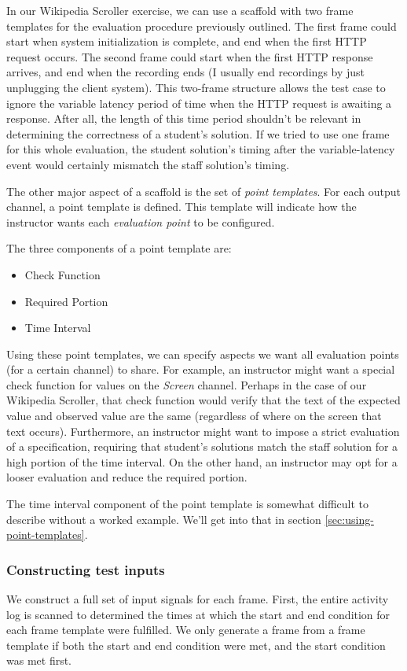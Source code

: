 \documentclass[12pt]{article}
\begin{document}
In our Wikipedia Scroller exercise, we can use a scaffold with two frame templates for the evaluation procedure previously outlined.  The first frame could start when system initialization is complete, and end when the first HTTP request occurs.  The second frame could start when the first HTTP response arrives, and end when the recording ends (I usually end recordings by just unplugging the client system).  This two-frame structure allows the test case to ignore the variable latency period of time when the HTTP request is awaiting a response.  After all, the length of this time period shouldn't be relevant in determining the correctness of a student's solution.  If we tried to use one frame for this whole evaluation, the student solution's timing after the variable-latency event would certainly mismatch the staff solution's timing.

The other major aspect of a scaffold is the set of \textit{point templates}.  For each output channel, a point template is defined.  This template will indicate how the instructor wants each \textit{evaluation point} to be configured.

The three components of a point template are:

\begin{itemize}
\item Check Function
\item Required Portion
\item Time Interval
\end{itemize}

Using these point templates, we can specify aspects we want all evaluation points (for a certain channel) to share.  For example, an instructor might want a special check function for values on the \textit{Screen} channel.  Perhaps in the case of our Wikipedia Scroller, that check function would verify that the text of the expected value and observed value are the same (regardless of where on the screen that text occurs).  Furthermore, an instructor might want to impose a strict evaluation of a specification, requiring that student's solutions match the staff solution for a high portion of the time interval.  On the other hand, an instructor may opt for a looser evaluation and reduce the required portion.

The time interval component of the point template is somewhat difficult to describe without a worked example.  We'll get into that in section \ref{sec:using-point-templates}.

\subsubsection{Constructing test inputs}
We construct a full set of input signals for each frame. First, the entire activity log is scanned to determined the times at which the start and end condition for each frame template were fulfilled.  We only generate a frame from a frame template if both the start and end condition were met, and the start condition was met first.
\end{document}
